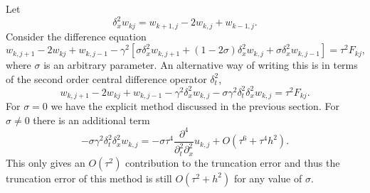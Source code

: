     Let
\[
\delta_{x}^2 w_{kj}=w_{k+1,j}-2w_{k,j}+w_{k-1,j}.
\]
Consider the difference equation
\begin{equation}
w_{k,j+1}-2w_{kj}+w_{k,j-1}-\gamma^{2} \left[\sigma \delta_{x}^2
w_{k,j+1}+(1-2\sigma)\delta_{x}^2 w_{k,j} +\sigma \delta_{x}^2
w_{k,j-1}\right]=\tau^2 F_{kj}, \label{15}
\end{equation}
where $\sigma$ is an arbitrary parameter. 
An alternative way of writing this is in terms of the second order central
difference operator $\delta_t^2$,
\begin{equation}
w_{k,j+1}-2w_{kj}+w_{k,j-1}-\gamma^{2} \delta_{x}^2 w_{k,j} 
-\sigma\gamma^2 \delta_t^2\delta_{x}^2w_{k,j}=\tau^2 F_{kj}.
\end{equation}
For $\sigma=0$ we have the 
explicit method discussed in the previous section. 
For $\sigma\neq 0$ there is an additional term
\begin{equation}
-\sigma \gamma^2\delta_t^2\delta_{x}^2w_{k,j}
=-\sigma\tau^4\frac{\partial^4}{\partial_t^2\partial_x^2}u_{k,j}
+O(\tau^6+\tau^4h^2).\label{est}
\end{equation}
This only gives an $O(\tau^2)$ contribution to the truncation error
and thus the truncation error of this method is still $O(\tau^2+h^2)$
for any value of $\sigma$.

